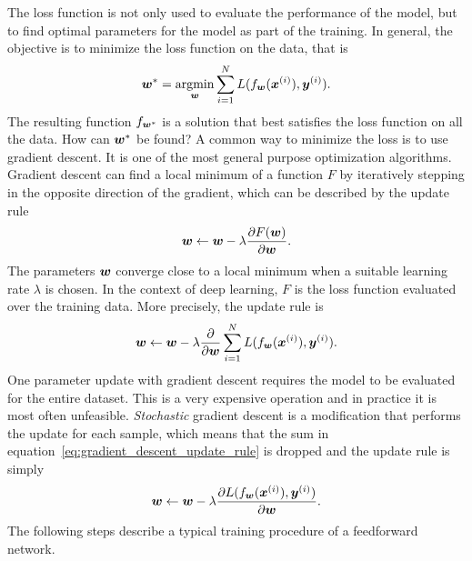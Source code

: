 		The loss function is not only used to evaluate the performance of the model, but to find optimal parameters for the model as part of the training.
		In general, the objective is to minimize the loss function on the data, that is
		\begin{equation}\label{eq:optimal_parameter_neural_network}
			\bm{w}^\ast = \operatorname*{argmin}_{\bm{w}} 
			\sum_{i = 1}^{N} 
				L(f_{\bm{w}}(\bm{x}^{(i)}), \bm{y}^{(i)}).
		\end{equation}
		The resulting function $f_{\bm{w}^\ast}$ is a solution that best satisfies the loss function on all the data.
		How can $\bm{w}^\ast$ be found?
		A common way to minimize the loss is to use gradient descent.
		It is one of the most general purpose optimization algorithms.
		Gradient descent can find a local minimum of a function $F$ by iteratively stepping in the opposite direction of the gradient, which can be described by the update rule
		\begin{equation}
			\bm{w} \leftarrow 
			\bm{w} - \lambda \frac{\partial F(\bm{w})}{\partial \bm{w}}.
		\end{equation}
		The parameters $\bm{w}$ converge close to a local minimum when a suitable learning rate $\lambda$ is chosen. 
		In the context of deep learning, $F$ is the loss function evaluated over the training data.
		More precisely, the update rule is
		\begin{equation}\label{eq:gradient_descent_update_rule}
			\bm{w} \leftarrow 
			\bm{w} - \lambda 
			\frac{\partial}{\partial \bm{w}}
			\sum_{i = 1}^{N} 
				L(f_{\bm{w}}(\bm{x}^{(i)}), \bm{y}^{(i)}).
		\end{equation}
		One parameter update with gradient descent requires the model to be evaluated for the entire dataset.
		This is a very expensive operation and in practice it is most often unfeasible.
		\emph{Stochastic} gradient descent is a modification that performs the update for each sample, which means that the sum in equation~\ref{eq:gradient_descent_update_rule} is dropped and the update rule is simply
		\begin{equation}\label{eq:stochastic_gradient_descent_update_rule}
			\bm{w} \leftarrow 
			\bm{w} - \lambda 
			\frac{\partial L(f_{\bm{w}}(\bm{x}^{(i)}), \bm{y}^{(i)})}{\partial \bm{w}}
			.
		\end{equation}
		The following steps describe a typical training procedure of a feedforward network.
